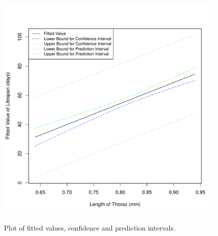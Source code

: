 \documentclass[12pt,letterpaper]{article}
\begin{document}
\begin{enumerate}[label=(\alph*)]
\begin{figure}[h!]\centering
	\caption{\footnotesize Plot of fitted values, confidence and prediction intervals.
	}\vspace{-1cm}
	\label{fig:plot3_c}
	\includegraphics[width=.85\textwidth]{plot3_g.pdf}\\
\end{figure}
\end{enumerate}
\end{document}
